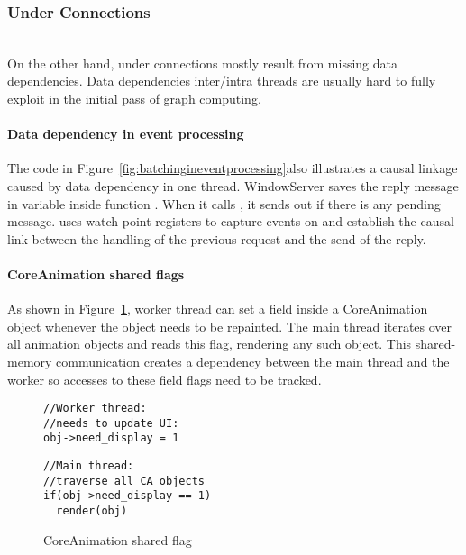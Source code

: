 \subsubsection{Under Connections}\hfill\\
On the other hand, under connections mostly result from missing data
dependencies. Data dependencies inter/intra threads are usually hard to fully
exploit in the initial pass of graph computing.

\paragraph{Data dependency in event processing}
The code in Figure~\ref{fig:batchingineventprocessing}also illustrates a causal linkage caused by data dependency in one thread.
WindowServer saves the reply message in
variable  inside function . When it calls
, it sends out  if there is any pending
message. \xxx uses watch point registers to capture events on  and
establish the causal link between the handling of the previous request and the
send of the reply.

\paragraph{CoreAnimation shared flags}
As shown in Figure~\ref{fig:casharedflag}, worker thread can set
a field  inside a CoreAnimation
object whenever the object needs to be repainted. The main thread iterates over
all animation objects and reads this flag, rendering any such object. This
shared-memory communication creates a dependency between the main thread and the
worker so accesses to these field flags need to be tracked.

\begin{figure}[ht!]
\begin{minipage}[t]{.20\textwidth}
\begin{lstlisting}
//Worker thread:
//needs to update UI:
obj->need_display = 1
\end{lstlisting}\hfill
\end{minipage}
\noindent\begin{minipage}[t]{.30\textwidth}
\begin{lstlisting}
//Main thread: 
//traverse all CA objects
if(obj->need_display == 1)
  render(obj)
\end{lstlisting}\hfill
\end{minipage}
    \caption{CoreAnimation shared flag}
    \label{fig:casharedflag}
\end{figure}

